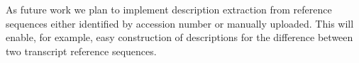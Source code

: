 \documentclass[final, slidestop]{beamer}
\begin{document}
\begin{frame}{}
\begin{myPoster}
{      As future work we plan to implement description extraction from reference
      sequences either identified by accession number or manually uploaded.
      This will enable, for example, easy construction of descriptions for the
      difference between two transcript reference sequences.
    }
  \end{myPoster}
\end{frame}
\end{document}
